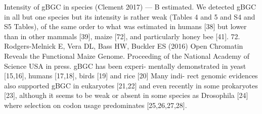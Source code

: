 



Intensity of gBGC in species (Clement 2017) — B estimated.
We detected gBGC in all but one species but its intensity is rather weak (Tables 4 and 5 and S4 and S5 Tables), of the same order to what was estimated in humans [38] but lower than in other mammals [39], maize [72], and particularly honey bee [41].
72. Rodgers-Melnick E, Vera DL, Bass HW, Buckler ES (2016) Open Chromatin Reveals the Functional Maize Genome. Proceeding of the National Academy of Science USA in press.
%
gBGC has been experi- mentally demonstrated in yeast [15,16], humans [17,18], birds [19] and rice [20]
 Many indi- rect genomic evidences also supported gBGC in eukaryotes [21,22] and even recently in some prokaryotes [23], although it seems to be weak or absent in some species as Drosophila [24] where selection on codon usage predominates [25,26,27,28].


